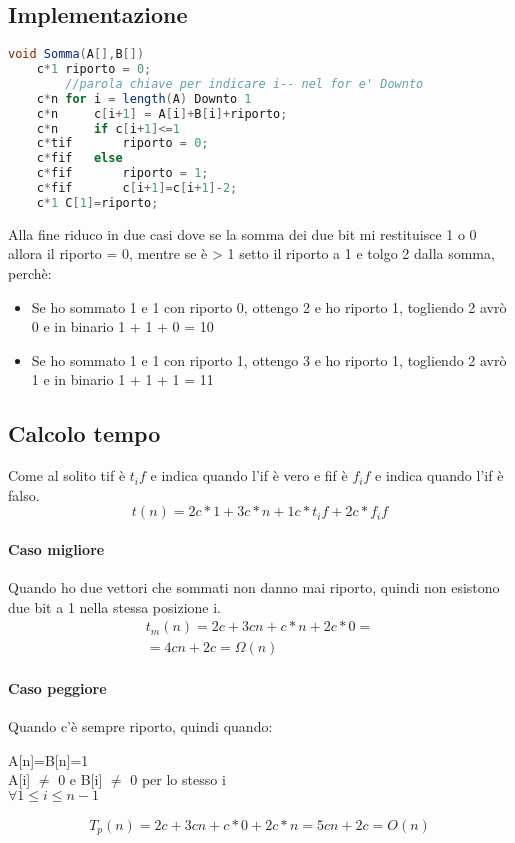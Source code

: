 \subsection{Implementazione}
\begin{lstlisting}[language=Java]
    void Somma(A[],B[])
    c*1 riporto = 0;
        //parola chiave per indicare i-- nel for e' Downto
    c*n for i = length(A) Downto 1 
    c*n     c[i+1] = A[i]+B[i]+riporto;
    c*n     if c[i+1]<=1
    c*tif       riporto = 0;
    c*fif   else
    c*fif       riporto = 1;
    c*fif       c[i+1]=c[i+1]-2;
    c*1 C[1]=riporto;
\end{lstlisting}
Alla fine riduco in due casi dove se la somma dei due bit mi restituisce 1 o 0 allora
il riporto = 0, mentre se è > 1 setto il riporto a 1 e tolgo 2 dalla somma, perchè:
\begin{itemize}
    \item Se ho sommato 1 e 1 con riporto 0, ottengo 2 e ho riporto 1, togliendo 2 avrò 0 e in binario 1 + 1 + 0 = 10
    \item Se ho sommato 1 e 1 con riporto 1, ottengo 3 e ho riporto 1, togliendo 2 avrò 1 e in binario 1 + 1 + 1 = 11
\end{itemize}
\subsection{Calcolo tempo}
Come al solito tif è $t_if$ e indica quando l'if è vero e fif è $f_if$ e indica quando l'if
è falso.
\begin{equation*}
    t(n)=2c*1+3c*n+1c*t_if + 2c*f_if
\end{equation*}
\paragraph*{Caso migliore} Quando ho due vettori che sommati non danno mai riporto, quindi non esistono due
bit a 1 nella stessa posizione i.\\
\begin{align*}
    t_m(n)=2c+3cn+c*n+2c*0=\\
    =4cn+2c=\Omega(n)
\end{align*}
\paragraph*{Caso peggiore} Quando c'è sempre riporto, quindi quando:
\begin{center}
    A[n]=B[n]=1\\
    A[i] $\neq$ 0 e B[i] $\neq$ 0 per lo stesso i\\
    $\forall 1 \leq i \leq n-1$
\end{center}
\begin{align*}
    T_p(n) = 2c+3cn+c*0+2c*n=5cn+2c= O(n)
\end{align*}
